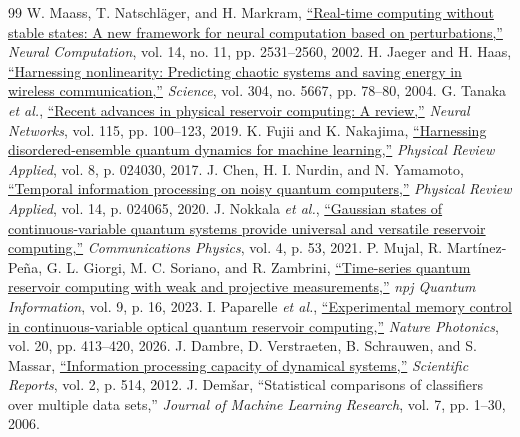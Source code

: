 \documentclass[10pt,conference]{IEEEtran}
\begin{document}
\enlargethispage{2\baselineskip}
{\footnotesize
\begin{thebibliography}{99}
\setlength{\itemsep}{-0.4ex}
\setlength{\parskip}{0pt}
 W. Maass, T. Natschl\"{a}ger, and H. Markram, \href{https://doi.org/10.1162/089976602760407955}{``Real-time computing without stable states: A new framework for neural computation based on perturbations,''} \emph{Neural Computation}, vol. 14, no. 11, pp. 2531--2560, 2002.
 H. Jaeger and H. Haas, \href{https://doi.org/10.1126/science.1091277}{``Harnessing nonlinearity: Predicting chaotic systems and saving energy in wireless communication,''} \emph{Science}, vol. 304, no. 5667, pp. 78--80, 2004.
 G. Tanaka \emph{et al.}, \href{https://doi.org/10.1016/j.neunet.2019.03.005}{``Recent advances in physical reservoir computing: A review,''} \emph{Neural Networks}, vol. 115, pp. 100--123, 2019.
 K. Fujii and K. Nakajima, \href{https://doi.org/10.1103/PhysRevApplied.8.024030}{``Harnessing disordered-ensemble quantum dynamics for machine learning,''} \emph{Physical Review Applied}, vol. 8, p. 024030, 2017.
 J. Chen, H. I. Nurdin, and N. Yamamoto, \href{https://doi.org/10.1103/PhysRevApplied.14.024065}{``Temporal information processing on noisy quantum computers,''} \emph{Physical Review Applied}, vol. 14, p. 024065, 2020.
 J. Nokkala \emph{et al.}, \href{https://doi.org/10.1038/s42005-021-00556-w}{``Gaussian states of continuous-variable quantum systems provide universal and versatile reservoir computing,''} \emph{Communications Physics}, vol. 4, p. 53, 2021.
 P. Mujal, R. Mart\'{i}nez-Pe\~{n}a, G. L. Giorgi, M. C. Soriano, and R. Zambrini, \href{https://doi.org/10.1038/s41534-023-00682-z}{``Time-series quantum reservoir computing with weak and projective measurements,''} \emph{npj Quantum Information}, vol. 9, p. 16, 2023.
 I. Paparelle \emph{et al.}, \href{https://doi.org/10.1038/s41566-026-01880-9}{``Experimental memory control in continuous-variable optical quantum reservoir computing,''} \emph{Nature Photonics}, vol. 20, pp. 413--420, 2026.
 J. Dambre, D. Verstraeten, B. Schrauwen, and S. Massar, \href{https://doi.org/10.1038/srep00514}{``Information processing capacity of dynamical systems,''} \emph{Scientific Reports}, vol. 2, p. 514, 2012.
 J. Dem{\v{s}}ar, ``Statistical comparisons of classifiers over multiple data sets,'' \emph{Journal of Machine Learning Research}, vol. 7, pp. 1--30, 2006.

\end{thebibliography}}
\end{document}
